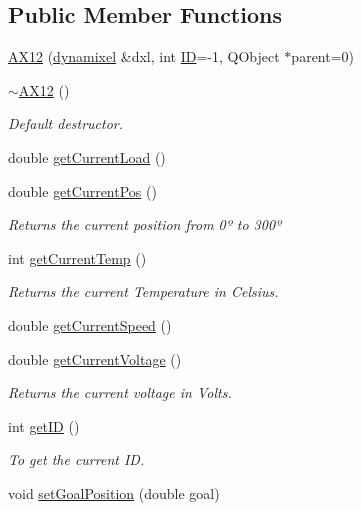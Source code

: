 \subsection*{Public Member Functions}
\begin{DoxyCompactItemize}
\item 
\hyperlink{class_a_x12_a31da599935777b1d8f81b2e014664dbe}{A\+X12} (\hyperlink{classdynamixel}{dynamixel} \&dxl, int \hyperlink{class_a_x12_a08d272b502d65464202a3aa97825aec0ab2565d5698c9d943a8bcecf02b1389ad}{I\+D}=-\/1, Q\+Object $\ast$parent=0)
\item 
\hyperlink{class_a_x12_a5e9382e65479cdcb248f5303ac4c96d9}{$\sim$\+A\+X12} ()
\begin{DoxyCompactList}\small\item\em Default destructor. \end{DoxyCompactList}\item 
double \hyperlink{class_a_x12_a0bd930c81b7a9c088ecab789b3a7e525}{get\+Current\+Load} ()
\item 
double \hyperlink{class_a_x12_af9722b9c1f82fbfd97fe5e0a44369e8a}{get\+Current\+Pos} ()
\begin{DoxyCompactList}\small\item\em Returns the current position from 0º to 300º \end{DoxyCompactList}\item 
int \hyperlink{class_a_x12_ab16fad4c8c034d56acce15fc9102f34d}{get\+Current\+Temp} ()
\begin{DoxyCompactList}\small\item\em Returns the current Temperature in Celsius. \end{DoxyCompactList}\item 
double \hyperlink{class_a_x12_a23c7ed54716c4b144a68d801f324e3ef}{get\+Current\+Speed} ()
\item 
double \hyperlink{class_a_x12_a9ef946bfc1ad4dce5fed4101ed321efe}{get\+Current\+Voltage} ()
\begin{DoxyCompactList}\small\item\em Returns the current voltage in Volts. \end{DoxyCompactList}\item 
int \hyperlink{class_a_x12_a745ab1f31fa2cd8c7a5797aeb605cd0b}{get\+I\+D} ()
\begin{DoxyCompactList}\small\item\em To get the current I\+D. \end{DoxyCompactList}\item 
void \hyperlink{class_a_x12_a6b27a3c6314604b499d9fa47d180f5d3}{set\+Goal\+Position} (double goal)

\end{DoxyCompactItemize}
